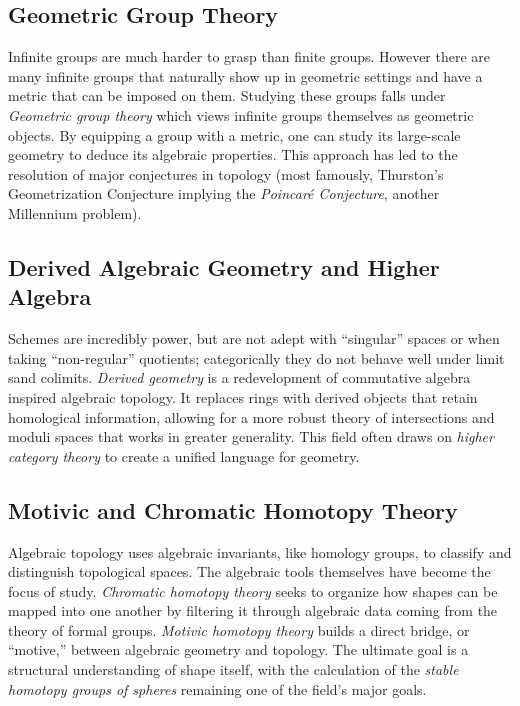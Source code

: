 \documentclass{article}
\begin{document}
\subsection*{Geometric Group Theory}

Infinite groups are much harder to grasp than finite groups. However there
are many infinite groups that naturally show up in geometric settings and have a metric that can be imposed
on them. Studying these groups falls under \emph{Geometric group theory} which views infinite
groups themselves as geometric objects. By equipping a group with a metric, one can study its large-scale
geometry to deduce its algebraic properties. This approach has led to the
resolution of major conjectures in topology (most famously, Thurston's Geometrization Conjecture implying the
\emph{Poincar\'e Conjecture}, another Millennium problem).


\subsection*{Derived Algebraic Geometry and Higher Algebra}

Schemes are incredibly power, but are not adept
with ``singular'' spaces or when taking ``non-regular'' quotients; categorically they do not behave well under
limit sand colimits. \emph{Derived geometry} is a
redevelopment of commutative algebra inspired algebraic topology. It replaces rings with
derived objects that retain homological information, allowing for a more robust theory of
intersections and moduli spaces that works in greater generality. This field often draws on \emph{higher category theory} to create a unified language for
geometry.

\subsection*{Motivic and Chromatic Homotopy Theory}

Algebraic topology uses algebraic invariants, like homology groups, to classify and distinguish topological
spaces. The algebraic tools themselves have become the focus of study.
\emph{Chromatic homotopy theory} seeks to organize how shapes can be mapped
into one another by filtering it through algebraic data coming from the theory of formal groups.
\emph{Motivic homotopy theory} builds a direct bridge, or ``motive,'' between algebraic geometry and topology.
The ultimate goal is a structural understanding of shape itself, with the calculation of the
\emph{stable homotopy groups of spheres} remaining one of the field's major goals.
\end{document}
